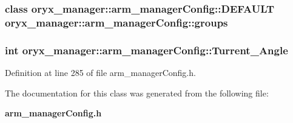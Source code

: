 \subsubsection[{groups}]{\setlength{\rightskip}{0pt plus 5cm}class {\bf oryx\-\_\-manager\-::arm\-\_\-manager\-Config\-::\-D\-E\-F\-A\-U\-L\-T} {\bf oryx\-\_\-manager\-::arm\-\_\-manager\-Config\-::groups}}\label{classoryx__manager_1_1arm__managerConfig_aeda78d9aafde6201a42173bf23614bac}
\subsubsection[{\-Turrent\-\_\-\-Angle}]{\setlength{\rightskip}{0pt plus 5cm}int {\bf oryx\-\_\-manager\-::arm\-\_\-manager\-Config\-::\-Turrent\-\_\-\-Angle}}\label{classoryx__manager_1_1arm__managerConfig_a0e354790f3b4c681c519a500a3825e6d}


\-Definition at line 285 of file arm\-\_\-manager\-Config.\-h.



\-The documentation for this class was generated from the following file\-:\begin{DoxyCompactItemize}
\item 
{\bf arm\-\_\-manager\-Config.\-h}\end{DoxyCompactItemize}
